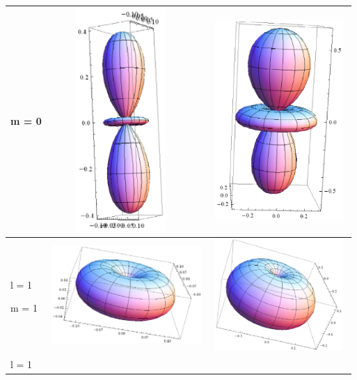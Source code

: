 \begin{tabular}{|m{1.472cm}|m{7.8010006cm}|m{7.0090003cm}|}
m = 0 &
\includegraphics[width=5.292cm,height=8.44cm]{chervinskaya-5.eps}
  &
\includegraphics[width=5.136cm,height=7.646cm]{chervinskaya-6.eps}
 \\\hline
l = 1

m = 1 &
\includegraphics[width=5.72cm,height=3.731cm]{chervinskaya-7.eps}
  &
\includegraphics[width=5.099cm,height=4.26cm]{chervinskaya-8.eps}
 \\\hline
l = 1


\end{tabular}
